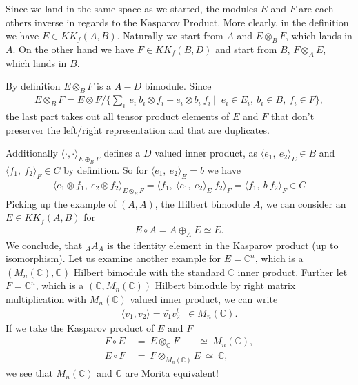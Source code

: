 Since we land in the same space as we started, the modules $E$ and $F$ are
each others inverse in regards to the Kasparov Product. More clearly, in the
definition we have $E \in KK_f(A, B)$. Naturally we start from $A$ and $E
\otimes _B F$, which lands in $A$. On the other hand we have $F \in KK_f(B,
D)$ and start from $B$, $F \otimes _A E$, which lands in $B$.

By definition  $E \otimes _B F$ is a $A-D$ bimodule. Since
\begin{align}
    E \otimes _B F = E \otimes F / \bigg\{\sum_i\ e_i\ b_i \otimes f_i - e_i
        \otimes b_i\ f_i\ \big|\;\; e_i \in E_i,\ b_i \in B,\ f_i \in F\bigg\},
\end{align}
the last part takes out all tensor product elements of $E$ and $F$ that don't
preserver the left/right representation and that are duplicates.

Additionally $\langle \cdot,\cdot\rangle _{E\oplus _B F}$ defines a $D$ valued
inner product, as $\langle e_1,\ e_2\rangle _E \in B$ and $\langle f_1,\ f_2\rangle _F \in C$ by
definition. So for $\langle e_1,\ e_2\rangle _E =b$ we have
\begin{align}
    \langle e_1 \otimes f_1,\ e_2 \otimes f_2\rangle _{E\otimes _B F} = \langle
    f_1,\ \langle e_1,\ e_2\rangle _E\ f_2\rangle _F = \langle f_1,\ b\ f_2\rangle _F \in C
\end{align}
Picking up the example of $(A, A)$, the Hilbert bimodule $A$, we can
consider an $E \in KK_f(A,B)$ for
\begin{align}
    E \circ A = A\oplus _A E \simeq E.
\end{align}
We conclude, that $_A A_A$ is the identity element in the Kasparov product (up
to isomorphism).
Let us examine another example for $E = \mathbb{C}^n$, which is a
$(M_n(\mathbb{C}), \mathbb{C})$ Hilbert bimodule with the standard $\mathbb{C}$
inner product. Further let $F = \mathbb{C}^n$, which is a $(\mathbb{C},
M_n(\mathbb{C}))$ Hilbert bimodule by right matrix multiplication with
$M_n(\mathbb{C})$ valued inner product, we can write
    \begin{align}
        \langle v_1, v_2\rangle =\bar{v_1}v_2^t \;\; \in M_n(\mathbb{C}).
    \end{align}
If we take the Kasparov product of $E$ and $F$
   \begin{align}
       F\circ E\ &=\  E\otimes _{\mathbb{C}}F\ \;\;\;\;\;\; \simeq \
        M_n(\mathbb{C}),\\
        E\circ F\ &=\ F\otimes _{M_n(\mathbb{C})}E\ \simeq\ \mathbb{C},
    \end{align}
we see that $M_n(\mathbb{C})$ and $\mathbb{C}$ are Morita equivalent!

